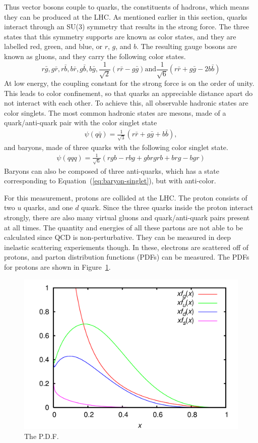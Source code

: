 Thus vector bosons couple to quarks, the constituents of hadrons,
which means they can be produced at the LHC.
As mentioned earlier in this section,
quarks interact through an SU(3) symmetry that results in the strong force.
The three states that this symmetry supports are known as color states,
and they are labelled red, green, and blue, or $r$, $g$, and $b$.
The resulting gauge bosons are known as gluons, and they carry the following color states.
\[
r\bar{g}, g\bar{r}, r\bar{b}, b\bar{r}, g\bar{b}, b\bar{g}, \frac{1}{\sqrt{2}}(r\bar{r} - g\bar{g}) \mathrm{and} \frac{1}{\sqrt{6}}(r\bar{r} + g\bar{g} - 2b\bar{b})
\]
At low energy, the coupling constant for the strong force is on the order of unity.
This leads to color confinement,
so that quarks an appreciable distance apart do not interact with each other.
To achieve this, all observable hadronic states are color singlets.
The most common hadronic states are mesons, made of a quark/anti-quark pair
with the color singlet state
\begin{gather}
  \psi(q\bar{q}) = \frac1{\sqrt{3}} (r\bar{r} + g\bar{g} + b\bar{b}),
\end{gather}
and baryons, made of three quarks with the following color singlet state.
\begin{gather}
  \psi(qqq) = \frac{1}{\sqrt{6}}(rgb - rbg + gbr  grb + brg - bgr) \label{eq:baryon-singlet}
\end{gather}
Baryons can also be composed of three anti-quarks,
which has a state corresponding to Equation~(\ref{eq:baryon-singlet}),
but with anti-color.

For this measurement, protons are collided at the LHC.
The proton consists of two $u$ quarks, and one $d$ quark.
Since the three quarks inside the proton interact strongly,
there are also many virtual gluons and quark/anti-quark pairs present at all times.
The quantity and energies of all these partons are not able to be calculated
since QCD is non-perturbative.
They can be measured in deep inelastic scattering experiements though.
In these, electrons are scattered off of protons,
and parton distribution functions (PDFs) can be measured.
The PDFs for protons are shown in Figure~\ref{fig:pdf}.
\begin{figure}
  \centering
  \includegraphics[width=0.7\linewidth]{figures/CTEQ6_parton_distribution_functions.png}
  \caption{The P.D.F.}
  \label{fig:pdf}
\end{figure}

